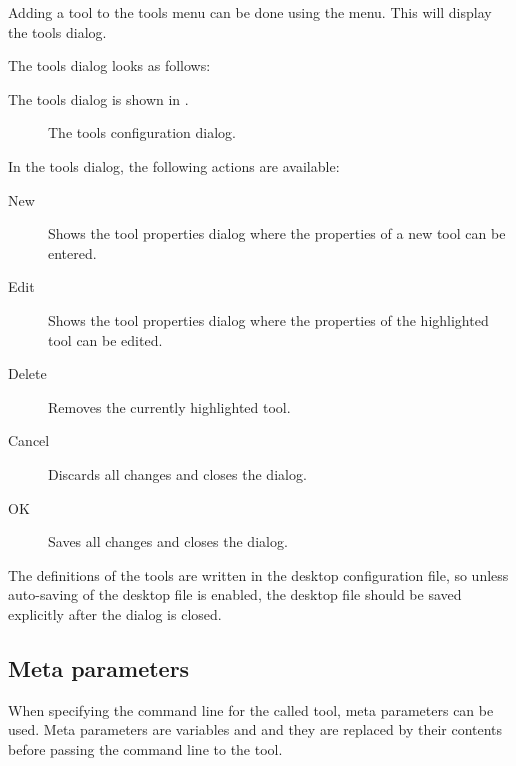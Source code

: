 Adding a tool to the tools menu can be done using the  menu.
This will display the tools dialog.
\begin{htmlonly}
The tools dialog looks as follows:
\end{htmlonly}
\begin{latexonly}
The tools dialog is shown in .
\begin{figure}[ht]
\begin{center}
\caption{The tools configuration dialog.}\label{fig:otools}
\ifpdf
{}
\else
{}
\fi
\end{center}
\end{figure}
\end{latexonly}
In the tools dialog, the following actions are available:
\begin{description}
\item[New] Shows the tool properties dialog where the
properties of a new tool can be entered.
\item[Edit] Shows the tool properties dialog where the
properties of the highlighted tool can be edited.
\item[Delete] Removes the currently highlighted tool.
\item[Cancel] Discards all changes and closes the dialog.
\item[OK] Saves all changes and closes the dialog.
\end{description}
The definitions of the tools are written in the desktop
configuration file, so unless auto-saving of the desktop file
is enabled, the desktop file should be saved explicitly after
the dialog is closed.

\subsection{Meta parameters}
When specifying the command line for the called tool, meta parameters can
be used. Meta parameters are variables and and they are replaced
by their contents before passing the command line to the tool.

